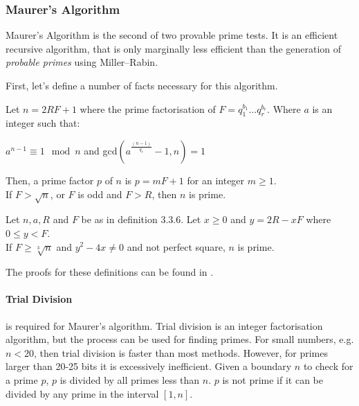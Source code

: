     \subsubsection{Maurer's Algorithm}
    
    Maurer's Algorithm is the second of two provable prime tests. It is an efficient recursive algorithm, that is only marginally less efficient than the generation of \emph{probable primes} using Miller--Rabin.
    
    First, let's define a number of facts necessary for this algorithm\cite{Maurer:1994aa}.
    
    \begin{mathdef}
      Let $n=2RF+1$ where the prime factorisation of $F=q_1^{b_1}...q_r^{b_r}$. Where $a$ is an integer such that: 
      \begin{center}
        $a^{n-1} \equiv 1 \mod n$ and gcd$(a^{\frac{(n-1)}{q_r}}-1,n) = 1$
      \end{center}
      Then, a prime factor $p$ of $n$ is $p = mF+1$ for an integer $m \geq 1$. \\
      If $F > \sqrt{n}$, or $F$ is odd and $F > R$, then $n$ is prime.
    \end{mathdef}
    
    \begin{mathdef}
      Let $n,a,R$ and $F$ be as in definition 3.3.6. Let $x \geq 0$ and $y = 2R - xF$ where $0 \leq y < F$. \\
      If $F \geq \sqrt[3]{n}$ and $y^2-4x \neq 0$ and not perfect square, $n$ is prime.
    \end{mathdef}
    
    The proofs for these definitions can be found in \cite{Maurer:1991aa}.
    
      \paragraph{Trial Division} 
      
      is required for Maurer's algorithm. Trial division is an integer factorisation algorithm, but the process can be used for finding primes. For small numbers, e.g. $n < 20$, then trial division is faster than most methods. However, for primes larger than 20-25 bits it is excessively inefficient\cite{Shwarz:2007aa}. Given a boundary $n$ to check for a prime $p$, $p$ is divided by all primes less than $n$. $p$ is not prime if it can be divided by any prime in the interval $[1,n]$. \\
      
